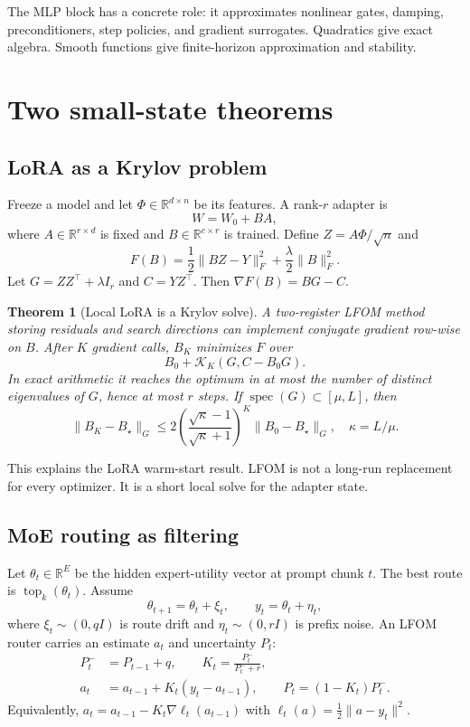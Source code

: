 \documentclass[10pt,twocolumn]{article}
\newtheorem{theorem}{Theorem}
\newcommand{\R}{\mathbb R}
\newcommand{\Krylov}{\mathcal K}
\newcommand{\topk}{\operatorname{top}_k}
\begin{document}
The MLP block has a concrete role: it approximates nonlinear gates, damping, preconditioners, step policies, and gradient surrogates. Quadratics give exact algebra. Smooth functions give finite-horizon approximation and stability.

\section{Two small-state theorems}
\subsection{LoRA as a Krylov problem}
Freeze a model and let $\Phi\in\R^{d\times n}$ be its features. A rank-$r$ adapter is
\[
   W=W_0+BA,
\]
where $A\in\R^{r\times d}$ is fixed and $B\in\R^{c\times r}$ is trained. Define $Z=A\Phi/\sqrt n$ and
\[
   F(B)=\frac12\|BZ-Y\|_F^2+\frac{\lambda}{2}\|B\|_F^2.
\]
Let $G=ZZ^\top+\lambda I_r$ and $C=YZ^\top$. Then $\nabla F(B)=BG-C$.

\begin{theorem}[Local LoRA is a Krylov solve]
A two-register LFOM method storing residuals and search directions can implement conjugate gradient row-wise on $B$. After $K$ gradient calls, $B_K$ minimizes $F$ over
\[
   B_0+\Krylov_K(G,C-B_0G).
\]
In exact arithmetic it reaches the optimum in at most the number of distinct eigenvalues of $G$, hence at most $r$ steps. If $\operatorname{spec}(G)\subset[\mu,L]$, then
\[
\|B_K-B_\star\|_G
\le 2\left(\frac{\sqrt\kappa-1}{\sqrt\kappa+1}\right)^K
\|B_0-B_\star\|_G,
\quad \kappa=L/\mu.
\]
\end{theorem}

This explains the LoRA warm-start result. LFOM is not a long-run replacement for every optimizer. It is a short local solve for the adapter state.

\subsection{MoE routing as filtering}
Let $\theta_t\in\R^E$ be the hidden expert-utility vector at prompt chunk $t$. The best route is $\topk(\theta_t)$. Assume
\[
\theta_{t+1}=\theta_t+\xi_t,\qquad y_t=\theta_t+\eta_t,
\]
where $\xi_t\sim(0,qI)$ is route drift and $\eta_t\sim(0,rI)$ is prefix noise. An LFOM router carries an estimate $a_t$ and uncertainty $P_t$:
\begin{align*}
P_t^- &= P_{t-1}+q,\qquad
K_t=\frac{P_t^-}{P_t^-+r},\\
a_t&=a_{t-1}+K_t(y_t-a_{t-1}),\qquad
P_t=(1-K_t)P_t^-.
\end{align*}
Equivalently, $a_t=a_{t-1}-K_t\nabla\ell_t(a_{t-1})$ with $\ell_t(a)=\frac12\|a-y_t\|^2$.
\end{document}
